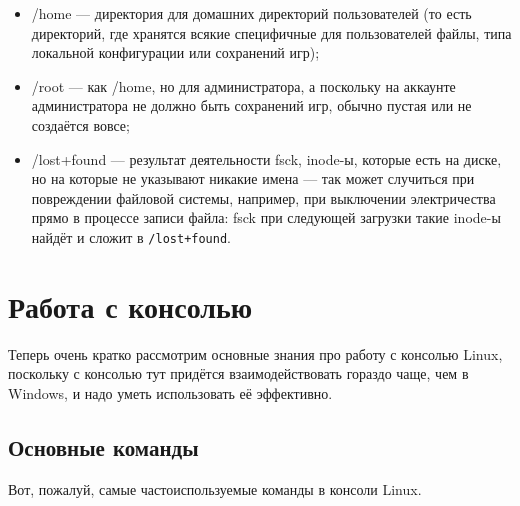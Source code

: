 \documentclass{../../text-style}
\begin{document}
\begin{itemize}
    \item /home --- директория для домашних директорий пользователей (то есть директорий, где хранятся всякие специфичные для пользователей файлы, типа локальной конфигурации или сохранений игр);
    \item /root --- как /home, но для администратора, а поскольку на аккаунте администратора не должно быть сохранений игр, обычно пустая или не создаётся вовсе;
    \item /lost+found --- результат деятельности fsck, inode-ы, которые есть на диске, но на которые не указывают никакие имена --- так может случиться при повреждении файловой системы, например, при выключении электричества прямо в процессе записи файла: fsck при следующей загрузки такие inode-ы найдёт и сложит в \verb|/lost+found|.
\end{itemize}

\section{Работа с консолью}

Теперь очень кратко рассмотрим основные знания про работу с консолью Linux, поскольку с консолью тут придётся взаимодействовать гораздо чаще, чем в Windows, и надо уметь использовать её эффективно.

\subsection{Основные команды}

Вот, пожалуй, самые частоиспользуемые команды в консоли Linux.
\end{document}
